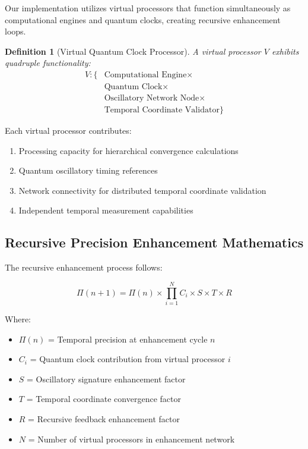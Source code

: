 \documentclass[12pt,a4paper]{article}
\newtheorem{definition}{Definition}
\begin{document}
Our implementation utilizes virtual processors that function simultaneously as computational engines and quantum clocks, creating recursive enhancement loops.

\begin{definition}[Virtual Quantum Clock Processor]
A virtual processor $V$ exhibits quadruple functionality:
\begin{align}
V: \{&\text{Computational Engine} \times \\
     &\text{Quantum Clock} \times \\
     &\text{Oscillatory Network Node} \times \\
     &\text{Temporal Coordinate Validator}\}
\end{align}
\end{definition}

Each virtual processor contributes:
\begin{enumerate}
\item Processing capacity for hierarchical convergence calculations
\item Quantum oscillatory timing references
\item Network connectivity for distributed temporal coordinate validation
\item Independent temporal measurement capabilities
\end{enumerate}

\subsection{Recursive Precision Enhancement Mathematics}

The recursive enhancement process follows:

\begin{equation}
\Pi(n+1) = \Pi(n) \times \prod_{i=1}^{N} C_i \times S \times T \times R
\end{equation}

Where:
\begin{itemize}
\item $\Pi(n)$ = Temporal precision at enhancement cycle $n$
\item $C_i$ = Quantum clock contribution from virtual processor $i$
\item $S$ = Oscillatory signature enhancement factor
\item $T$ = Temporal coordinate convergence factor
\item $R$ = Recursive feedback enhancement factor
\item $N$ = Number of virtual processors in enhancement network
\end{itemize}
\end{document}
